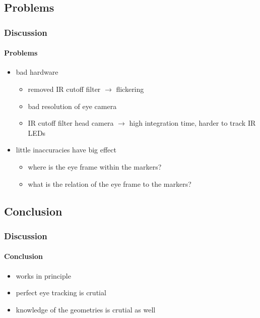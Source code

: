 \documentclass[%
14pt
]{beamer}
\begin{document}
\subsection{Problems}
\begin{frame}
	\frametitle{Discussion}
  \framesubtitle{Problems}
  \begin{itemize}
    \item bad hardware
      \begin{itemize}
        \item removed IR cutoff filter $\rightarrow$ flickering
        \item bad resolution of eye camera
        \item IR cutoff filter head camera $\rightarrow$ high integration time, harder to track IR LEDs
      \end{itemize}
    \item little inaccuracies have big effect
      \begin{itemize}
        \item where is the eye frame within the markers?
        \item what is the relation of the eye frame to the markers?
      \end{itemize}
  \end{itemize}
\end{frame}
\subsection{Conclusion}
\begin{frame}
	\frametitle{Discussion}
  \framesubtitle{Conclusion}
  \begin{itemize}
    \item works in principle
    \item perfect eye tracking is crutial
    \item knowledge of the geometries is crutial as well
  \end{itemize}
\end{frame}
\end{document}
